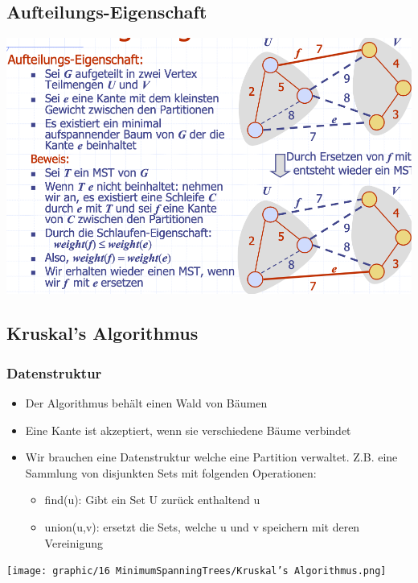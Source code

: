 \subsection{Aufteilungs-Eigenschaft}
\begin{center}
    \includegraphics[scale=.32]{graphic/16 MinimumSpanningTrees/Aufteilungs-Eigenschaft.png}
\end{center}
\vspace{-8pt}

\subsection{Kruskal’s Algorithmus}
\subsubsection{Datenstruktur}
\begin{itemize}
    \item Der Algorithmus behält einen Wald von Bäumen
    \item Eine Kante ist akzeptiert, wenn sie verschiedene Bäume verbindet
    \item Wir brauchen eine Datenstruktur welche eine Partition verwaltet. Z.B. eine Sammlung von disjunkten Sets mit folgenden Operationen:
    \begin{itemize}
        \item find(u): Gibt ein Set U zurück enthaltend u
        \item union(u,v): ersetzt die Sets, welche u und v speichern mit deren Vereinigung
    \end{itemize}
\end{itemize}
\begin{center}
    \texttt{[image: graphic/16 MinimumSpanningTrees/Kruskal’s Algorithmus.png]}
\end{center}
\vspace{-8pt}

